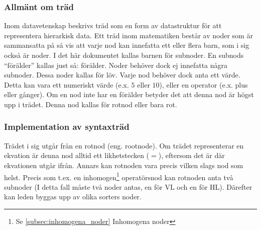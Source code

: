\documentclass[12pt,a4paper]{article}
\begin{document}
\subsubsection{Allmänt om träd}
Inom datavetenskap beskrivs träd som en form av datastruktur för att representera hierarkisk data. Ett träd inom matematiken består av noder som är sammansatta på så vis att varje nod kan innefatta ett eller flera barn, som i sig också är noder. I det här dokumentet kallas barnen för subnoder. En subnods ``förälder'' kallas just så: förälder. Noder behöver dock ej innefatta några subnoder. Dessa noder kallas för löv. Varje nod behöver dock anta ett värde. Detta kan vara ett numeriskt värde (e.x. \(5\) eller \(10\)), eller en operator (e.x. plus eller gånger). Om en nod inte har en förälder betyder det att denna nod är högst upp i trädet. Denna nod kallas för rotnod eller bara rot.
\subsubsection{Implementation av syntaxträd}
Trädet i sig utgår från en rotnod (eng. rootnode). Om trädet representerar en ekvation är denna nod alltid ett likhetstecken (\(=\)), eftersom det är där ekvationen utgår ifrån. Annars kan rotnoden vara precis vilken slags nod som helst. Precis som t.ex. en inhomogen\footnote{Se \ref{subsec:inhomogena_noder} Inhomogena noder} operatörsnod kan rotnoden anta två subnoder (I detta fall måste två noder antas, en för VL och en för HL). Därefter kan leden byggas upp av olika sorters noder.
\end{document}
